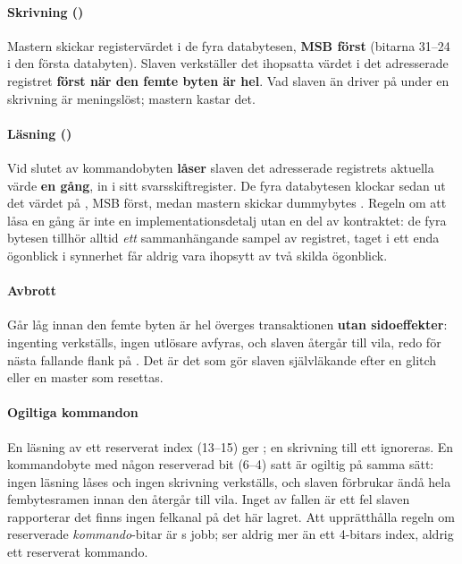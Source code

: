 \paragraph{Skrivning ()}
Mastern skickar registervärdet i de fyra databytesen, \textbf{MSB först} (bitarna 31--24 i den första
databyten). Slaven verkställer det ihopsatta värdet i det adresserade registret \textbf{först när den
femte byten är hel}. Vad slaven än driver på  under en skrivning är meningslöst; mastern
kastar det.

\paragraph{Läsning ()}
Vid slutet av kommandobyten \textbf{låser} slaven det adresserade registrets aktuella värde
\textbf{en gång}, in i sitt svarsskiftregister. De fyra databytesen klockar sedan ut det värdet på
, MSB först, medan mastern skickar dummybytes . Regeln om att låsa en gång är
inte en implementationsdetalj utan en del av kontraktet: de fyra bytesen tillhör alltid \emph{ett}
sammanhängande sampel av registret, taget i ett enda ögonblick \textemdash{}  i
synnerhet får aldrig vara ihopsytt av två skilda ögonblick.

\paragraph{Avbrott}
Går  låg innan den femte byten är hel överges transaktionen \textbf{utan
sidoeffekter}: ingenting verkställs, ingen utlösare avfyras, och slaven återgår till vila, redo för
nästa fallande flank på . Det är det som gör slaven självläkande efter en glitch eller en
master som resettas.

\paragraph{Ogiltiga kommandon}
En läsning av ett reserverat index (13--15) ger ; en skrivning till ett ignoreras. En
kommandobyte med någon reserverad bit (6--4) satt är ogiltig på samma sätt: ingen läsning låses och
ingen skrivning verkställs, och slaven förbrukar ändå hela fembytesramen innan den återgår till vila.
Inget av fallen är ett fel slaven rapporterar \textemdash{} det finns ingen felkanal på det här
lagret. Att upprätthålla regeln om reserverade \emph{kommando}-bitar är s jobb;
 ser aldrig mer än ett 4-bitars index, aldrig ett reserverat kommando.

